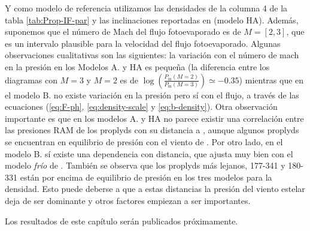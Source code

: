 Y como modelo de referencia utilizamos las densidades de la columna 4 de la tabla \ref{tab:Prop-IF-par} y las inclinaciones reportadas en \citet{HA:1998} (modelo HA). Además, suponemos que el número de Mach del flujo fotoevaporado es de $M=[2, 3]$, que es un intervalo plausible para la velocidad del flujo fotoevaporado. Algunas observaciones cualitativas son las siguientes: la variación con el número de mach en la presión en los Modelos A. y HA es pequeña (la diferencia entre los diagramas con $M=3$ y $M=2$ es de $\log\left(\frac{P_{\mathrm{in}}(M=2)}{P_{\mathrm{in}}(M=3)}\right)\simeq -0.35$) mientras que en el modelo B. no existe variación en la presión pero sí con el flujo, a través de las ecuaciones (\ref{eq:F-ph}, \ref{eq:density-scale} y \ref{eq:b-density}). Otra observación importante es que en los modelos A. y HA no parece existir una correlación entre las presiones RAM de los proplyds con su distancia a \thC{}, aunque algunos proplyds se encuentran en equilibrio de presión con el viento de \thC{}. Por otro lado, en el modelo B. sí existe una dependencia con distancia, que ajusta muy bien con el modelo \textit{frío} de \citet{Gagne:2005}. También se observa que los proplyds más lejanos, 177-341 y 180-331 están por encima de equilibrio de presión en los tres modelos para la densidad. Esto puede deberse a que a estas distancias la presión del viento estelar deja de ser dominante y otros factores empiezan a ser importantes.

Los resultados de este capítulo serán publicados próximamente.
